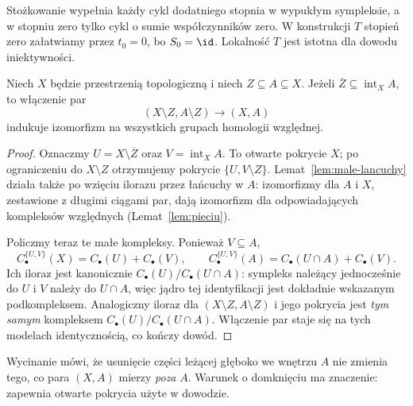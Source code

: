 Stożkowanie wypełnia każdy cykl dodatniego stopnia w wypukłym
sympleksie, a w stopniu zero tylko cykl o sumie współczynników zero.
W konstrukcji $T$ stopień zero załatwiamy przez $t_0=0$,
bo $S_0=\id$. Lokalność $T$ jest istotna dla dowodu iniektywności.

\begin{twierdzenie}[Wycinanie]
\label{thm:wycinanie}
Niech $X$ będzie przestrzenią topologiczną
i niech $Z\subseteq A\subseteq X$.
Jeżeli
$\overline Z\subseteq\operatorname{int}_X A$,
to włączenie par
\[
 (X\setminus Z,A\setminus Z)\longrightarrow(X,A)
\]
indukuje izomorfizm na wszystkich
grupach homologii względnej.
\end{twierdzenie}
\begin{proof}
Oznaczmy $U=X\setminus\overline Z$
oraz $V=\operatorname{int}_X A$.
To otwarte pokrycie $X$;
po ograniczeniu do $X\setminus Z$
otrzymujemy pokrycie
$\{U,V\setminus Z\}$.
Lemat~\ref{lem:male-lancuchy} działa
także po wzięciu ilorazu przez
łańcuchy w $A$: izomorfizmy
dla $A$ i $X$, zestawione
z długimi ciągami par, dają
izomorfizm dla odpowiadających
kompleksów względnych
(Lemat~\ref{lem:pieciu}).

Policzmy teraz te małe kompleksy.
Ponieważ $V\subseteq A$,
\[
 C_\bullet^{\{U,V\}}(X)
   =C_\bullet(U)+C_\bullet(V),\qquad
 C_\bullet^{\{U,V\}}(A)
   =C_\bullet(U\cap A)+C_\bullet(V).
\]
Ich iloraz jest kanonicznie
$C_\bullet(U)/C_\bullet(U\cap A)$:
sympleks należący jednocześnie do
$U$ i $V$ należy do $U\cap A$,
więc jądro tej identyfikacji jest
dokładnie wskazanym podkompleksem.
Analogiczny iloraz dla
$(X\setminus Z,A\setminus Z)$
i jego pokrycia jest \emph{tym samym}
kompleksem
$C_\bullet(U)/C_\bullet(U\cap A)$.
Włączenie par staje się na tych
modelach identycznością, co
kończy dowód.
\end{proof}

Wycinanie mówi, że usunięcie części
leżącej głęboko we wnętrzu $A$
nie zmienia tego, co para $(X,A)$
mierzy \emph{poza} $A$. Warunek
o domknięciu ma znaczenie:
zapewnia otwarte pokrycia użyte
w dowodzie.

